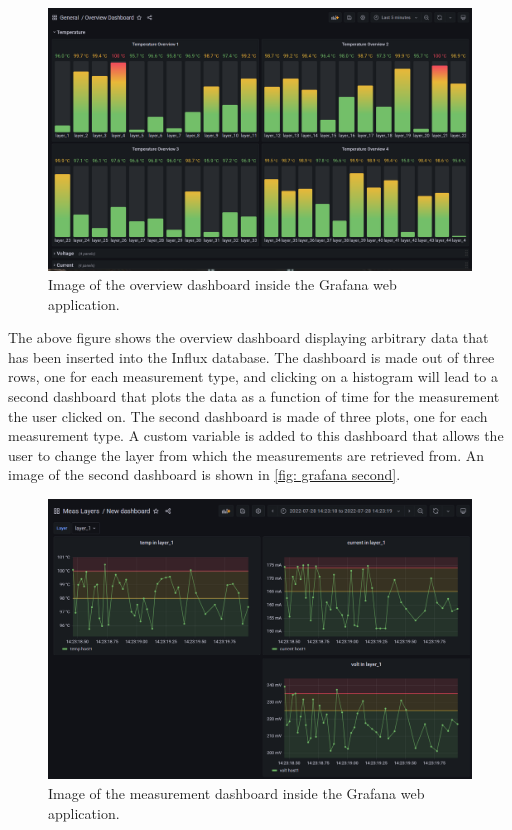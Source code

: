 \documentclass[main.tex]{subfiles}
\begin{document}
\begin{figure}[!htpb]
    \centering
    \includegraphics[width=17cm, scale=4]{images/grafana_overview.png}
    \caption{Image of the overview dashboard inside the Grafana web application.}
    \label{fig: grafana overview}
\end{figure}
\FloatBarrier

The above figure shows the overview dashboard displaying arbitrary data that has been inserted into the Influx database. The dashboard is made out of three rows, one for each measurement type, and clicking on a histogram will lead to a second dashboard that plots the data as a function of time for the measurement the user clicked on. The second dashboard is made of three plots, one for each measurement type. A custom variable is added to this dashboard that allows the user to change the layer from which the measurements are retrieved from. An image of the second dashboard is shown in \autoref{fig: grafana second}.

\begin{figure}[!htpb]
    \centering
    \includegraphics[width=15cm, scale=4]{images/grafana_2nd_dashboard.png}
    \caption{Image of the measurement dashboard inside the Grafana web application.}
    \label{fig: grafana second}
\end{figure}
\FloatBarrier
\end{document}
